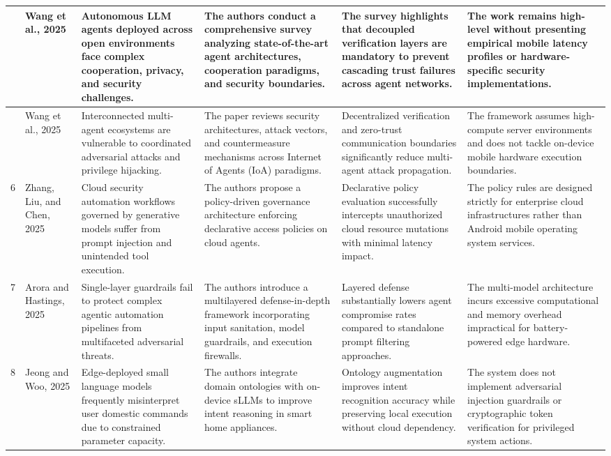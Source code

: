 \begin{center}
\begin{longtable}{|>{\centering\arraybackslash}p{0.55cm}|p{2.0cm}|p{2.7cm}|p{2.8cm}|p{2.7cm}|p{2.7cm}|}
4 & Wang et al., 2025 \cite{wang2025large} & Autonomous LLM agents deployed across open environments face complex cooperation, privacy, and security challenges. & The authors conduct a comprehensive survey analyzing state-of-the-art agent architectures, cooperation paradigms, and security boundaries. & The survey highlights that decoupled verification layers are mandatory to prevent cascading trust failures across agent networks. & The work remains high-level without presenting empirical mobile latency profiles or hardware-specific security implementations. \\
\hline

5 & Wang et al., 2025 \cite{wang2025security} & Interconnected multi-agent ecosystems are vulnerable to coordinated adversarial attacks and privilege hijacking. & The paper reviews security architectures, attack vectors, and countermeasure mechanisms across Internet of Agents (IoA) paradigms. & Decentralized verification and zero-trust communication boundaries significantly reduce multi-agent attack propagation. & The framework assumes high-compute server environments and does not tackle on-device mobile hardware execution boundaries. \\
\hline

6 & Zhang, Liu, and Chen, 2025 \cite{iaecst2025securing} & Cloud security automation workflows governed by generative models suffer from prompt injection and unintended tool execution. & The authors propose a policy-driven governance architecture enforcing declarative access policies on cloud agents. & Declarative policy evaluation successfully intercepts unauthorized cloud resource mutations with minimal latency impact. & The policy rules are designed strictly for enterprise cloud infrastructures rather than Android mobile operating system services. \\
\hline

7 & Arora and Hastings, 2025 \cite{arora2025securing} & Single-layer guardrails fail to protect complex agentic automation pipelines from multifaceted adversarial threats. & The authors introduce a multilayered defense-in-depth framework incorporating input sanitation, model guardrails, and execution firewalls. & Layered defense substantially lowers agent compromise rates compared to standalone prompt filtering approaches. & The multi-model architecture incurs excessive computational and memory overhead impractical for battery-powered edge hardware. \\
\hline

8 & Jeong and Woo, 2025 \cite{jeong2025device} & Edge-deployed small language models frequently misinterpret user domestic commands due to constrained parameter capacity. & The authors integrate domain ontologies with on-device sLLMs to improve intent reasoning in smart home appliances. & Ontology augmentation improves intent recognition accuracy while preserving local execution without cloud dependency. & The system does not implement adversarial injection guardrails or cryptographic token verification for privileged system actions. \\
\hline


\end{longtable}
\end{center}
